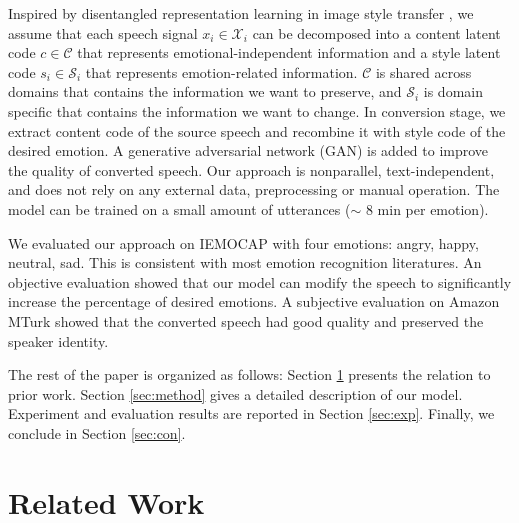 \documentclass{article}
\begin{document}
Inspired by disentangled representation learning in image style transfer \cite{gatys2016image}, we assume that each speech signal $x_i \in \mathcal{X}_i$ can be decomposed into a content latent code $c \in \mathcal{C}$ that represents emotional-independent information and a style latent code $s_i \in \mathcal{S}_i$ that represents emotion-related information. $\mathcal{C}$ is shared across domains that contains the information we want to preserve, and $\mathcal{S}_i$ is domain specific that contains the information we want to change. In conversion stage, we extract content code of the source speech and recombine it with style code of the desired emotion. A generative adversarial network (GAN) \cite{goodfellow2014generative} is added to improve the quality of converted speech. Our approach is nonparallel, text-independent, and does not rely on any external data, preprocessing or manual operation. The model can be trained on a small amount of utterances ($\sim$ 8 min per emotion).


We evaluated our approach on IEMOCAP \cite{busso2008iemocap} with four emotions: angry, happy, neutral, sad. This is consistent with most emotion recognition literatures.
An objective evaluation showed that our model can modify the speech to significantly increase the percentage of desired emotions. A subjective evaluation on Amazon MTurk showed that the converted speech had good quality and preserved the speaker identity.

The rest of the paper is organized as follows: Section \ref{sec:related} presents the relation to prior work. Section \ref{sec:method} gives a detailed description of our model. Experiment and evaluation results are reported in Section \ref{sec:exp}. Finally, we conclude in Section \ref{sec:con}.


\section{Related Work}
\label{sec:related}
\end{document}
